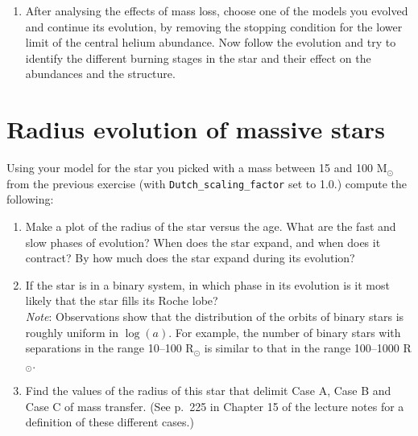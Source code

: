 \documentclass[11pt,a4paper]{article}
\begin{document}
\begin{enumerate}[label=(\alph*)]
\item After analysing the effects of mass loss, choose one of the models you evolved and continue its evolution, by removing the stopping condition for the lower limit of the central helium abundance. 
Now follow the evolution and try to identify the different burning stages in the star and their effect on the abundances and the structure. 

\end{enumerate}



\section{Radius evolution of massive stars}

Using your model for the star you picked with a mass between 15 and 100 M$_\odot$ from the previous exercise (with \verb|Dutch_scaling_factor| set to 1.0.) compute the following:

\begin{enumerate}[label=(\alph*)]
\item Make a plot of the radius of the star versus the age. What are the fast and slow phases of evolution? When does the star expand, and when does it contract? By how much does the star expand during its evolution?
\item If the star is in a binary system, in which phase in its evolution is it most likely that the star fills its Roche lobe?\\
\textit{Note}: Observations show that the distribution of the orbits of binary stars is roughly uniform in $\log(a)$. For example, the number of binary stars with separations in the range 10--100 R$_\odot$ is similar to that in the range 100--1000 R$_\odot$.
\item Find the values of the radius of this star that delimit Case A, Case B and Case C of mass transfer. (See p.\ 225 in Chapter 15 of the lecture notes for a definition of these different cases.)
\end{enumerate}
\end{document}
